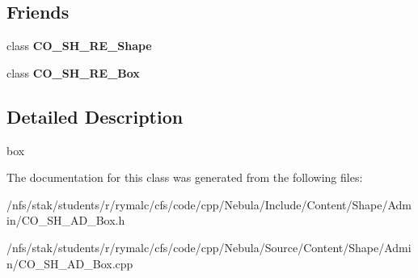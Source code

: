 \subsection*{Friends}
\begin{DoxyCompactItemize}
\item 
\hypertarget{classContent_1_1Shape_1_1Admin_1_1Box_ada14878e2fc0904acf45a44502c5cca0}{
class {\bfseries CO\_\-SH\_\-RE\_\-Shape}}
\label{classContent_1_1Shape_1_1Admin_1_1Box_ada14878e2fc0904acf45a44502c5cca0}

\item 
\hypertarget{classContent_1_1Shape_1_1Admin_1_1Box_ae598bfbad4f6a4fbca774ede1fb477d9}{
class {\bfseries CO\_\-SH\_\-RE\_\-Box}}
\label{classContent_1_1Shape_1_1Admin_1_1Box_ae598bfbad4f6a4fbca774ede1fb477d9}

\end{DoxyCompactItemize}


\subsection{Detailed Description}
box 

The documentation for this class was generated from the following files:\begin{DoxyCompactItemize}
\item 
/nfs/stak/students/r/rymalc/cfs/code/cpp/Nebula/Include/Content/Shape/Admin/CO\_\-SH\_\-AD\_\-Box.h\item 
/nfs/stak/students/r/rymalc/cfs/code/cpp/Nebula/Source/Content/Shape/Admin/CO\_\-SH\_\-AD\_\-Box.cpp\end{DoxyCompactItemize}
